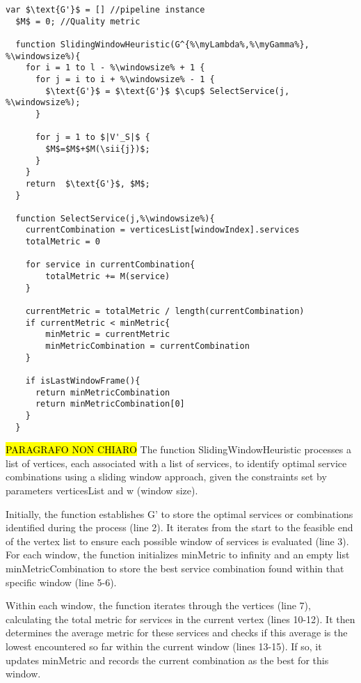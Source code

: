 \begin{lstlisting}[frame=bt, escapechar=\%,mathescape, caption={Sliding Window Heuristic with Selection of First Service from Optimal Combination},label={lst:slidingwindowfirstservice}]
  var $\text{G'}$ = [] //pipeline instance
  $M$ = 0; //Quality metric

  function SlidingWindowHeuristic(G^{%\myLambda%,%\myGamma%}, %\windowsize%){
    for i = 1 to l - %\windowsize% + 1 {
      for j = i to i + %\windowsize% - 1 {
        $\text{G'}$ = $\text{G'}$ $\cup$ SelectService(j, %\windowsize%);
      }

      for j = 1 to $|V'_S|$ {
        $M$=$M$+$M(\sii{j})$;
      }
    }
    return  $\text{G'}$, $M$;
  }

  function SelectService(j,%\windowsize%){
    currentCombination = verticesList[windowIndex].services
    totalMetric = 0

    for service in currentCombination{
        totalMetric += M(service)
    }

    currentMetric = totalMetric / length(currentCombination)
    if currentMetric < minMetric{
        minMetric = currentMetric
        minMetricCombination = currentCombination
    }

    if isLastWindowFrame(){
      return minMetricCombination
      return minMetricCombination[0]
    }
  }

  \end{lstlisting}

  \hl{PARAGRAFO NON CHIARO} The function SlidingWindowHeuristic processes a list of vertices, each associated with a list of services, to identify optimal service combinations using a sliding window approach, given the constraints set by parameters verticesList and w (window size).

  Initially, the function establishes $\text{G'}$ to store the optimal services or combinations identified during the process (line 2). It iterates from the start to the feasible end of the vertex list to ensure each possible window of services is evaluated (line 3). For each window, the function initializes minMetric to infinity and an empty list minMetricCombination to store the best service combination found within that specific window (line 5-6).

  Within each window, the function iterates through the vertices (line 7), calculating the total metric for services in the current vertex (lines 10-12). It then determines the average metric for these services and checks if this average is the lowest encountered so far within the current window (lines 13-15). If so, it updates minMetric and records the current combination as the best for this window.

